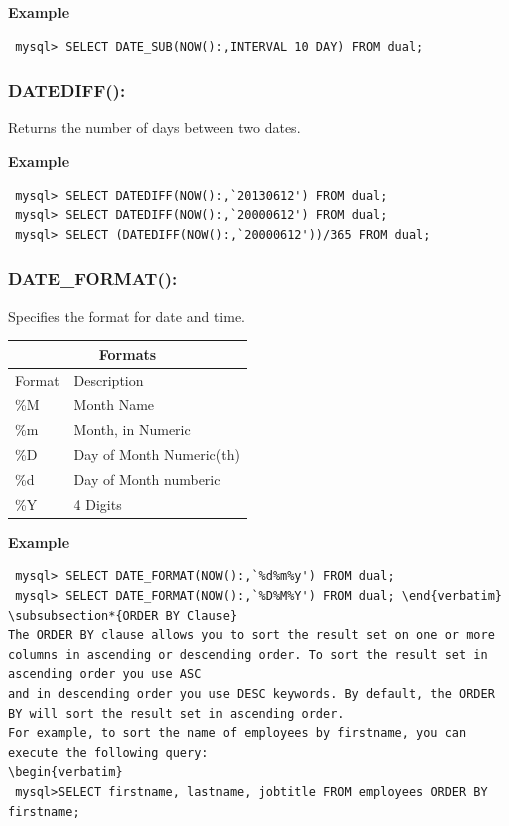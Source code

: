 \documentclass[11pt,a4paper]{article}
\begin{document}
\textbf{Example}
\begin{verbatim} mysql> SELECT DATE_SUB(NOW():,INTERVAL 10 DAY) FROM dual; \end{verbatim}

\subsubsection*{DATEDIFF():} Returns the number of days between two dates.

\textbf{Example}
\begin{verbatim} 
 mysql> SELECT DATEDIFF(NOW():,`20130612') FROM dual; 
 mysql> SELECT DATEDIFF(NOW():,`20000612') FROM dual; 
 mysql> SELECT (DATEDIFF(NOW():,`20000612'))/365 FROM dual; \end{verbatim}

\subsubsection*{DATE\_FORMAT():} Specifies the format for date and time.\\
\begin{tabular}{||l|l||}\hline

\multicolumn{2}{c}{Formats}\\\hline\hline

Format         & Description\\\hline
\%M	       & Month Name \\
\%m            & Month, in Numeric  \\ 
\%D	       & Day of Month Numeric(th) \\
\%d           & Day of Month numberic\\
\%Y           & 4 Digits
\\\hline
\end{tabular}

\textbf{Example}

\begin{verbatim}
 mysql> SELECT DATE_FORMAT(NOW():,`%d%m%y') FROM dual; 
 mysql> SELECT DATE_FORMAT(NOW():,`%D%M%Y') FROM dual; \end{verbatim}
\subsubsection*{ORDER BY Clause}
The ORDER BY clause allows you to sort the result set on one or more columns in ascending or descending order. To sort the result set in ascending order you use ASC
and in descending order you use DESC keywords. By default, the ORDER BY will sort the result set in ascending order.
For example, to sort the name of employees by firstname, you can execute the following query:
\begin{verbatim}
 mysql>SELECT firstname, lastname, jobtitle FROM employees ORDER BY firstname;
\end{verbatim}
\end{document}
